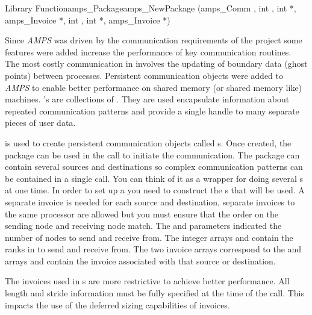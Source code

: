 \begin{deftypefn}{Library Function}{amps_Package}{amps\_NewPackage}
(amps_Comm , int , int *,
amps_Invoice *, int , int
*, amps_Invoice *)

\DESCRIPTION

Since {\em AMPS} was driven by the communication requirements of the
\parflow{} project some features were added increase the
performance of key \parflow{} communication routines.  The most
costly communication in \parflow{} involves the updating of
boundary data (ghost points) between processes.  Persistent
communication objects were added to {\em AMPS} to enable better
performance on shared memory (or shared memory like) machines.
's are collections of .  They
are used encapsulate information about repeated communication patterns
and provide a single handle to many separate pieces of user data.

 is used to create persistent communication
objects called s.  Once created, the package can be
used in the  call to initiate the
communication.  The package can contain several sources and
destinations so complex communication patterns can be contained in a
single call.  You can think of it as a wrapper for doing several
s at one time.  In order to set up a
 you need to construct the s
that will be used.  A separate invoice is needed for each source and
destination, separate invoices to the same processor are allowed but
you must ensure that the order on the sending node and receiving node
match.  The  and  parameters indicated
the number of nodes to send and receive from.  The integer arrays
 and  contain the ranks in  to send and
receive from.  The two invoice arrays correspond to the 
and  arrays and contain the invoice associated with that
source or destination.

The invoices used in s are more restrictive to
achieve better performance.  All length and stride information must be
fully specified at the time of the  call.  This
impacts the use of the deferred sizing capabilities of invoices.


\end{deftypefn}

